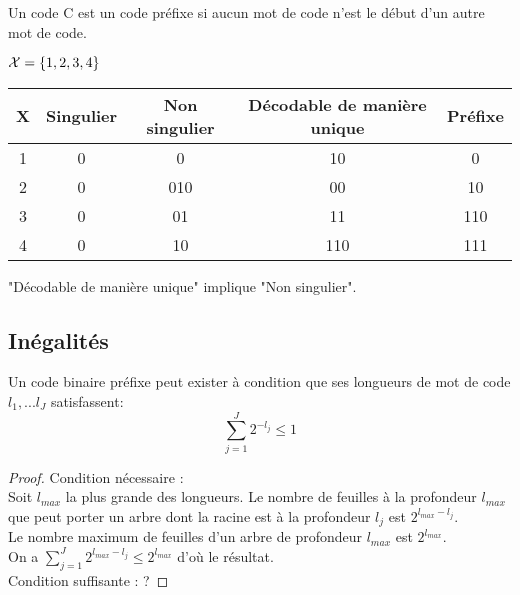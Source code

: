 \documentclass[main.tex]{subfiles}
\begin{document}
\begin{defin}
Un code C est un code préfixe si aucun mot de code n'est le début d'un autre mot de code.\\
\end{defin}
\begin{exemple}
$\mathcal{X} = \{1,2,3,4\}$\\

\begin{center}
\begin{tabular}{|c||c|c|c|c|}
\hline
X & Singulier & Non singulier & Décodable de manière unique & Préfixe \\
\hline
\hline
1 & 0 & 0 & 10 & 0 \\
\hline
2 & 0 & 010 & 00 & 10 \\
\hline
3 & 0 & 01 & 11 & 110 \\
\hline
4 & 0 & 10 & 110 & 111 \\
\hline
\end{tabular}
\end{center}

\end{exemple}

\begin{rem}
"Décodable de manière unique" implique "Non singulier".
\end{rem}

\subsection{Inégalités}

\begin{prop}
Un code binaire préfixe peut exister à condition que ses longueurs de mot de code $l_1,...l_J$ satisfassent:
\[\sum_{j=1}^J2^{-l_j} \leq 1 \]


\end{prop}
\begin{proof} Condition nécessaire : \\
Soit $l_{max}$ la plus grande des longueurs.
Le nombre de feuilles à la profondeur $l_{max}$ que peut porter un arbre dont la racine est à la profondeur $l_j$ est $2^{l_{max}-l_j}$.\\

Le nombre maximum de feuilles d'un arbre de profondeur $l_{max}$ est $2^{l_{max}}$.\\

On a $\sum_{j=1}^J2^{l_{max}-l_j} \leq 2^{l_{max}}$ d'où le résultat.\\

Condition suffisante : ?
\end{proof}
\end{document}
